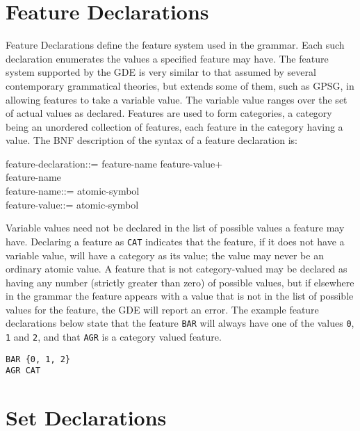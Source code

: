 \section{Feature Declarations}

Feature Declarations define the feature system used in the grammar. Each
such declaration enumerates the values a specified feature may have.
The feature system supported by the GDE is very similar to that assumed
by several contemporary grammatical theories, but extends some of them,
such as GPSG, in allowing features to take a variable value. The
variable value ranges over the set of actual values as declared.
Features are used to form categories, a category being an unordered
collection of features, each feature in the category having a value. The
BNF description of the syntax of a feature declaration is:
\begin{display}
\la feature-declaration\ra ::= \la feature-name\ra \lit{\{} \la feature-value\ran+ \lit{\}} \alt\\
\cont \la feature-name\ra {}\\
\la feature-name\ra ::= \la atomic-symbol\ra\\
\la feature-value\ra ::= \la atomic-symbol\ra
\end{display}
Variable values need not be declared in the list of possible values a
feature may have. Declaring a feature as {\tt CAT} indicates that
the feature, if it does not have a variable value, will have a category
as its value; the value may never be an ordinary atomic value. A
feature that is not category-valued may be declared as having any number
(strictly greater than zero) of possible values, but if elsewhere in the
grammar the feature appears with a value that is not in the list of
possible values for the feature, the GDE will report an error. The
example feature declarations below state that the feature {\tt BAR}
will always have one of the values {\tt 0}, {\tt 1} and {\tt 2}, and
that {\tt AGR} is a category valued feature.
\begin{ex}
\begin{verbatim}
BAR {0, 1, 2}
AGR CAT
\end{verbatim}
\end{ex}

\section{Set Declarations}

